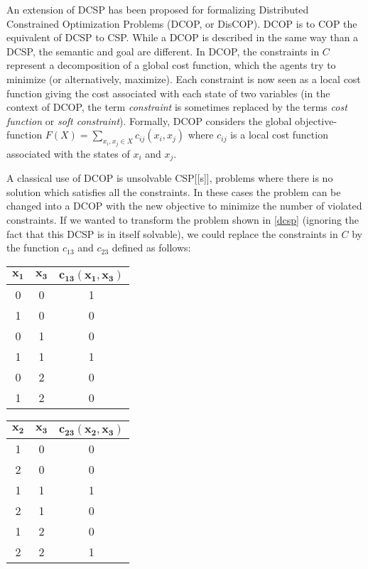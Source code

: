 An extension of DCSP has been proposed for formalizing Distributed Constrained Optimization Problems (DCOP, or DisCOP). DCOP is to COP the equivalent of DCSP to CSP. While a DCOP is described in the same way than a DCSP, the semantic and goal are different.
In DCOP, the constraints in $C$ represent a decomposition of a global cost function, which the agents try to minimize (or alternatively, maximize). Each constraint is now seen as a local cost function giving the cost associated with each state of two variables (in the context of DCOP, the term \emph{constraint} is sometimes replaced by the terms \emph{cost function} or \emph{soft constraint}). Formally, DCOP considers the global objective-function $F(X) = \displaystyle\sum_{x_i, x_j \in X} c_{ij}(x_i,x_j)$ where $c_{ij}$ is a local cost function associated with the states of $x_i$ and $x_j$.

A classical use of DCOP is unsolvable CSP[[s]], problems where there is no solution which satisfies all the constraints. In these cases the problem can be changed into a DCOP with the new objective to minimize the number of violated constraints. If we wanted to transform the problem shown in \figurename{} \ref{dcsp} (ignoring the fact that this DCSP is in itself solvable), we could replace the constraints in $C$ by the function $c_{13}$ and $c_{23}$ defined as follows:

\begin{center}
\begin{tabular}{ccc}
\toprule
$\boldsymbol{x_1}$	& $\boldsymbol{x_3}$ & $\boldsymbol{c_{13}(x_1,x_3)}$\\
\midrule
0   & 0	& 1\\
1   & 0	& 0\\
0   & 1	& 0\\
1   & 1	& 1\\
0   & 2	& 0\\
1   & 2	& 0\\
\bottomrule
\end{tabular}
\quad
\begin{tabular}{ccc}
\toprule
$\boldsymbol{x_2}$	& $\boldsymbol{x_3}$ & $\boldsymbol{c_{23}(x_2,x_3)}$\\
\midrule
1   & 0	& 0\\
2   & 0	& 0\\
1   & 1	& 1\\
2   & 1	& 0\\
1   & 2	& 0\\
2   & 2	& 1\\
\bottomrule
\end{tabular}
\end{center}

